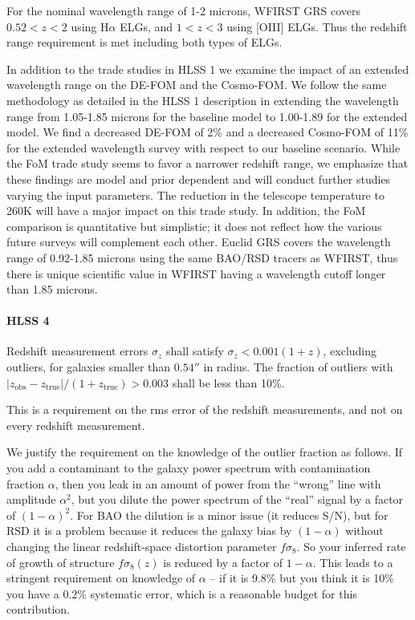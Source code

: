  For the nominal wavelength range of 1-2 microns, WFIRST GRS covers $0.52 < z <
 2$ using H$\alpha$ ELGs, and $1 < z < 3$ using [OIII] ELGs. Thus the redshift range
 requirement is met including both types of ELGs.

 In addition to the trade studies in HLSS 1 we examine the impact of an extended
 wavelength range on the DE-FOM and the Cosmo-FOM. We follow the same methodology
 as detailed in the HLSS 1 description in extending the wavelength range from
 1.05-1.85 microns for the baseline model to 1.00-1.89 for the extended model.
 We find a decreased DE-FOM of 2\% and a decreased
 Cosmo-FOM of 11\% for the extended wavelength survey with respect to our
 baseline scenario. While the FoM trade study seems to favor a narrower redshift
 range, we emphasize that these findings are model and prior dependent and will
 conduct further studies varying the input parameters. The reduction in the
 telescope temperature to 260K will have a major impact on this trade study. In
 addition, the FoM comparison is quantitative but simplistic; it does not reflect
 how the various future surveys will complement each other. Euclid GRS covers the
 wavelength range of 0.92-1.85 microns using the same BAO/RSD tracers as WFIRST,
 thus there is unique scientific value in WFIRST having a wavelength cutoff
 longer than 1.85 microns.

\paragraph{HLSS 4} Redshift measurement errors $\sigma_z$ shall satisfy $\sigma_z < 0.001(1+z)$, excluding outliers, for galaxies smaller than $0.54''$ in radius. The fraction of outliers with $|z_\mathrm{obs}-
 z_\mathrm{true}|/(1+z_\mathrm{true})>0.003$ shall be less than 10\%.

 This is a requirement on the rms error of the redshift measurements, and not on
 every redshift measurement.

 We justify the requirement on the knowledge of the outlier fraction as follows.
 If you add a contaminant to the galaxy power spectrum with contamination
 fraction $\alpha$, then you leak in an amount of power from the ``wrong'' line
 with amplitude $\alpha^2$, but you dilute the power spectrum of the ``real''
 signal by a factor of $(1-\alpha)^2$. For BAO the dilution is a minor issue (it
 reduces S/N), but for RSD it is a problem because it reduces the galaxy bias by
 $(1-\alpha)$ without changing the linear redshift-space distortion parameter
 $f\sigma_8$. So your inferred rate of growth of structure $f\sigma_8(z)$ is
 reduced by a factor of $1-\alpha$.  This leads to a stringent requirement on
 knowledge of $\alpha$ -- if it is 9.8\% but you think it is 10\% you have a
 0.2\% systematic error, which is a reasonable budget for this contribution.


